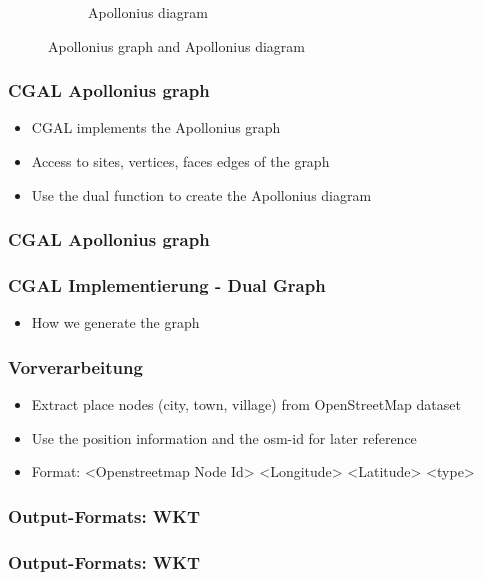 \documentclass{beamer}
\begin{document}
\begin{frame}
\begin{figure}[htp]
\begin{subfigure}[b]{0.48\textwidth}
                    \caption{Apollonius diagram}
                    \label{fig:apo-diagram}
            \end{subfigure}
            \caption{Apollonius graph and Apollonius diagram}\label{fig:apollonius}
    \end{figure}
\end{frame}

\begin{frame}
    \frametitle{CGAL Apollonius graph}
    \begin{itemize}
        \item CGAL implements the Apollonius graph
        \item Access to sites, vertices, faces edges of the graph
        \item Use the dual function to create the Apollonius diagram
    \end{itemize}
\end{frame}

\begin{frame}
    \frametitle{CGAL Apollonius graph}
    
\end{frame}

\begin{frame}
    \frametitle{CGAL Implementierung - Dual Graph}
    \begin{itemize}
        \item How we generate the graph
    \end{itemize}
\end{frame}

\begin{frame}
    \frametitle{Vorverarbeitung}
    \begin{itemize}
        \item Extract place nodes (city, town, village) from OpenStreetMap dataset 
        \item Use the position information and the osm-id for later reference
        \item Format: <Openstreetmap Node Id> <Longitude> <Latitude> <type>
    \end{itemize}
\end{frame}

\begin{frame}
    \frametitle{Output-Formats: WKT}
    
\end{frame}

\begin{frame}
    \frametitle{Output-Formats: WKT}
    
\end{frame}
\end{document}
